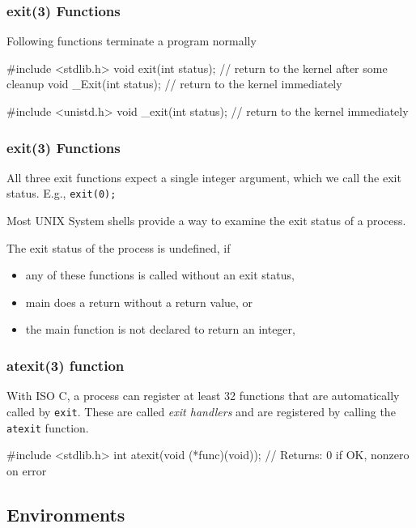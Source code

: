 \documentclass[newPxFont,sthlmFooter,nooffset]{beamer}
\begin{document}
\begin{frame}[containsverbatim,t]
  \frametitle{exit(3) Functions}
Following functions terminate a program normally
\begin{codedef}
#include <stdlib.h>
void exit(int status); // return to the kernel after some cleanup
void _Exit(int status); // return to the kernel immediately

#include <unistd.h>
void _exit(int status);  // return to the kernel immediately
\end{codedef}

\end{frame}

\begin{frame}[t]
  \frametitle{exit(3) Functions}
All three exit functions expect a single integer argument, which we
call the exit status. E.g., \texttt{exit(0);}

Most UNIX System shells provide a way to examine the exit status of a
process.

The exit status of the process is undefined, if
\begin{itemize}
\item any of these functions is called without an exit status,
\item main does a return without a return value, or
\item the main function is not declared to return an integer,
\end{itemize}

\end{frame}


\begin{frame}[containsverbatim,t]
  \frametitle{atexit(3) function}
With ISO C, a process can register at least 32 functions that are automatically called by
\texttt{exit}. These are called \textit{exit handlers} and are registered by calling the \texttt{atexit} function.

\begin{codedef}
#include <stdlib.h>
int atexit(void (*func)(void));
// Returns: 0 if OK, nonzero on error
\end{codedef}


\end{frame}





\subsection{Environments}
\end{document}
